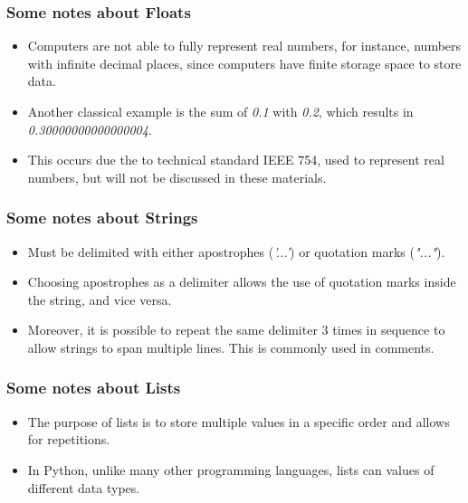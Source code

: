 \documentclass{beamer}
\begin{document}
\begin{frame}
    \frametitle{Some notes about Floats}
    \begin{itemize}
        \item Computers are not able to fully represent real numbers, for 
        instance, numbers with infinite decimal places, since computers have
        finite storage space to store data.
        \item Another classical example is the sum of \textit{0.1} with 
        \textit{0.2}, which results in \textit{0.30000000000000004}.
        \item This occurs due the to technical standard IEEE 754, used to
        represent real numbers, but will not be discussed in these materials.
    \end{itemize}
\end{frame}

\begin{frame}
    \frametitle{Some notes about Strings}
    \begin{itemize}
        \item Must be delimited with either apostrophes (\textit{'...'}) or 
        quotation marks (\textit{"..."}). 
        \item Choosing apostrophes as a delimiter allows the use of quotation
        marks inside the string, and vice versa.
        \item Moreover, it is possible to repeat the same delimiter 3 times in
        sequence to allow strings to span multiple lines. This is commonly used
        in comments.
    \end{itemize}
\end{frame}

\begin{frame}
    \frametitle{Some notes about Lists}
    \begin{itemize}
        \item The purpose of lists is to store multiple values in a specific
        order and allows for repetitions.
        \item In Python, unlike many other programming languages, lists can
        values of different data types.
    \end{itemize}
\end{frame}

\end{document}
